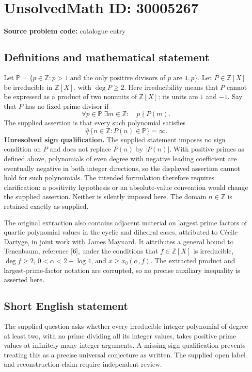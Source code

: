 \documentclass[11pt]{article}
\newcommand{\Z}{\mathbb{Z}}
\begin{document}
\section*{UnsolvedMath ID: 30005267}
\textbf{Source problem code:} catalogue entry
\subsection{Definitions and mathematical statement}
Let \(\mathbb P=\{p\in\Z:p>1\text{ and the only positive divisors of }p\text{ are }1,p\}\). Let \(P\in\Z[X]\) be irreducible in \(\Z[X]\), with \(\deg P\geq2\). Here irreducibility means that \(P\) cannot be expressed as a product of two nonunits of \(\Z[X]\); its units are \(1\) and \(-1\). Say that \(P\) has no fixed prime divisor if
\[
\forall p\in\mathbb P\;\exists m\in\Z:\quad p\nmid P(m).
\]
The supplied assertion is that every such polynomial satisfies
\[
\#\{n\in\Z:P(n)\in\mathbb P\}=\infty.
\]
\textbf{Unresolved sign qualification.} The supplied statement imposes no sign condition on \(P\) and does not replace \(P(n)\) by \(\lvert P(n)\rvert\). With positive primes as defined above, polynomials of even degree with negative leading coefficient are eventually negative in both integer directions, so the displayed assertion cannot hold for such polynomials. The intended formulation therefore requires clarification: a positivity hypothesis or an absolute-value convention would change the supplied assertion. Neither is silently imposed here. The domain \(n\in\Z\) is retained exactly as supplied.

The original extraction also contains adjacent material on largest prime factors of quartic polynomial values in the cyclic and dihedral cases, attributed to C\'ecile Dartyge, in joint work with James Maynard. It attributes a general bound to Tenenbaum, reference [6], under the conditions that \(f\in\Z[X]\) is irreducible, \(\deg f\geq2\), \(0<\alpha<2-\log4\), and \(x\geq x_0(\alpha,f)\). The extracted product and largest-prime-factor notation are corrupted, so no precise auxiliary inequality is asserted here.
\subsection{Short English statement}
The supplied question asks whether every irreducible integer polynomial of degree at least two, with no prime dividing all its integer values, takes positive prime values at infinitely many integer arguments. A missing sign qualification prevents treating this as a precise universal conjecture as written. The supplied open label and reconstruction claim require independent review.
\end{document}
